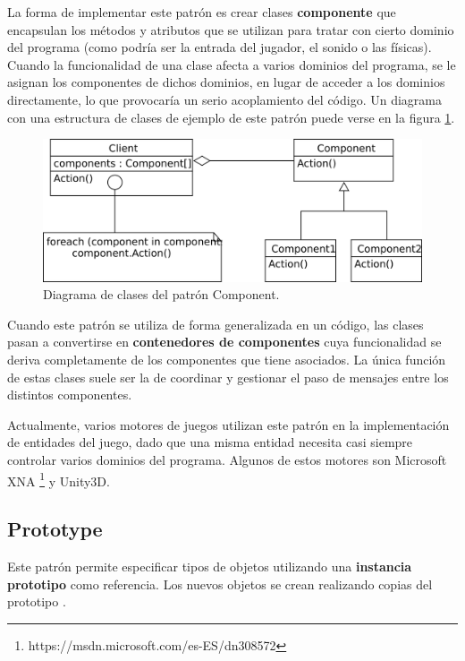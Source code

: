 La forma de implementar este patrón es crear clases \textbf{componente} que encapsulan los métodos y atributos que se utilizan para tratar con cierto dominio del programa (como podría ser la entrada del jugador, el sonido o las físicas). Cuando la funcionalidad de una clase afecta a varios dominios del programa, se le asignan los componentes de dichos dominios, en lugar de acceder a los dominios directamente, lo que provocaría un serio acoplamiento del código. Un diagrama con una estructura de clases de ejemplo de este patrón puede verse en la figura \ref{component_diagram}.
\begin{figure}[h]
	\includegraphics[width=1\textwidth]{images/estructura/patrones/component}
	\centering
	\caption{Diagrama de clases del patrón Component.}
	\label{component_diagram}
\end{figure}

Cuando este patrón se utiliza de forma generalizada en un código, las clases pasan a convertirse en \textbf{contenedores de componentes} cuya funcionalidad se deriva completamente de los componentes que tiene asociados. La única función de estas clases suele ser la de coordinar y gestionar el paso de mensajes entre los distintos componentes.

Actualmente, varios motores de juegos utilizan este patrón en la implementación de entidades del juego, dado que una misma entidad necesita casi siempre controlar varios dominios del programa. Algunos de estos motores son Microsoft XNA \footnote{https://msdn.microsoft.com/es-ES/dn308572} y Unity3D.

\subsection{Prototype}
Este patrón permite especificar tipos de objetos utilizando una \textbf{instancia prototipo} como referencia. Los nuevos objetos se crean realizando copias del prototipo \cite{design_patterns}.

